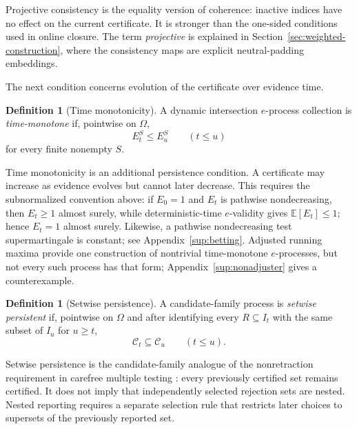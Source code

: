 \documentclass[11pt]{article}
\numberwithin{equation}{section}
\theoremstyle{plain}
\theoremstyle{definition}
\newtheorem{definition}[theorem]{Definition}
\newcommand{\E}{\mathbb E}
\newcommand{\C}{\mathcal C}
\begin{document}
Projective consistency is the equality version of coherence: inactive indices have no effect on the current certificate. It is stronger than the one-sided conditions used in online closure. The term \emph{projective} is explained in Section~\ref{sec:weighted-construction}, where the consistency maps are explicit neutral-padding embeddings.

The next condition concerns evolution of the certificate over evidence time.

\begin{definition}[Time monotonicity]\label{def:time-monotone}
A dynamic intersection $e$-process collection is \emph{time-monotone} if, pointwise on $\Omega$,
\begin{equation}\label{eq:time-monotone}
  E_t^S\leq E_u^S\qquad(t\leq u)
\end{equation}
for every finite nonempty $S$.
\end{definition}

Time monotonicity is an additional persistence condition. A certificate may increase as evidence evolves but cannot later decrease. This requires the subnormalized convention above: if $E_0=1$ and $E_t$ is pathwise nondecreasing, then $E_t\geq1$ almost surely, while deterministic-time $e$-validity gives $\E[E_t]\leq1$; hence $E_t=1$ almost surely. Likewise, a pathwise nondecreasing test supermartingale is constant; see Appendix~\ref{sup:betting}. Adjusted running maxima provide one construction of nontrivial time-monotone $e$-processes, but not every such process has that form; Appendix~\ref{sup:nonadjuster} gives a counterexample.

\begin{definition}[Setwise persistence]\label{def:setwise-persistence}
A candidate-family process is \emph{setwise persistent} if, pointwise on $\Omega$ and after identifying every $R\subseteq I_t$ with the same subset of $I_u$ for $u\geq t$,
\[
  \C_t\subseteq\C_u\qquad(t\leq u).
\]
\end{definition}

Setwise persistence is the candidate-family analogue of the nonretraction requirement in carefree multiple testing \citep{TavyrikovGoemanDeHeide2026}: every previously certified set remains certified. It does not imply that independently selected rejection sets are nested. Nested reporting requires a separate selection rule that restricts later choices to supersets of the previously reported set.
\end{document}
